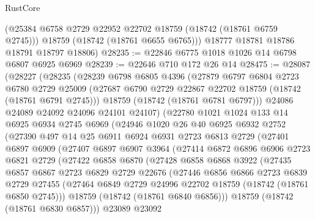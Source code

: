 \begin{lexlean}{RustCore}
\begin{coremodule}
        (@25384 @6758 @2729 @22952 @22702 @18759 (@18742 (@18761 @6759 @2745)))
        @18759
        (@18742 (@18761 @6655 @6765)))
      @18777
      @18781
      @18786
      @18791
      @18797
      @18806)
@28235 := @22846 @6775 @1018 @1026 @14 @6798 @6807 @6925 @6969
@28239 := @22646 @710 @172 @26 @14
@28475 := @28087
    (@28227
      (@28235
        (@28239
          @6798
          @6805
          @4396
          (@27879
            @6797
            @6804
            @2723
            @6780
            @2729
            @25009
            (@27687 @6790 @2729 @22867 @22702 @18759 (@18742 (@18761 @6791 @2745)))
            @18759
            (@18742 (@18761 @6781 @6797)))
          @24086
          @24089
          @24092
          @24096
          @24101
          @24107)
        (@22780
          @1021
          @1024
          @133
          @14
          @6925
          @6934
          @2745
          @6969
          (@24946
            @1020
            @26
            @40
            @6925
            @6932
            @2752
            (@27390
              @497
              @14
              @25
              @6911
              @6924
              @6931
              @2723
              @6813
              @2729
              (@27401
                @6897
                @6909
                (@27407
                  @6897
                  @6907
                  @3964
                  (@27414
                    @6872
                    @6896
                    @6906
                    @2723
                    @6821
                    @2729
                    (@27422
                      @6858
                      @6870
                      (@27428
                        @6858
                        @6868
                        @3922
                        (@27435
                          @6857
                          @6867
                          @2723
                          @6829
                          @2729
                          @22676
                          (@27446
                            @6856
                            @6866
                            @2723
                            @6839
                            @2729
                            @27455
                            (@27464 @6849 @2729 @24996 @22702 @18759 (@18742 (@18761 @6850 @2745)))
                            @18759
                            (@18742 (@18761 @6840 @6856)))
                          @18759
                          (@18742 (@18761 @6830 @6857)))
                        @23089
                        @23092

\end{coremodule}
\end{lexlean}
